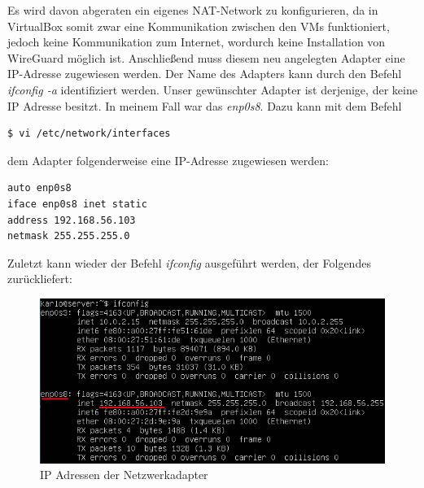 Es wird davon abgeraten ein eigenes NAT-Network zu konfigurieren, da in VirtualBox somit zwar eine Kommunikation zwischen den VMs funktioniert, jedoch keine Kommunikation zum Internet, wordurch keine Installation von WireGuard möglich ist. \newpage \noindent
Anschließend muss diesem neu angelegten Adapter eine IP-Adresse zugewiesen werden. Der Name des Adapters kann durch den Befehl \textit{ifconfig -a} identifiziert werden. Unser gewünschter Adapter ist derjenige, der keine IP Adresse besitzt. In meinem Fall war das \textit{enp0s8}. Dazu kann mit dem Befehl 
\begin{lstlisting}
$ vi /etc/network/interfaces
\end{lstlisting}
dem Adapter folgenderweise eine IP-Adresse zugewiesen werden:
\begin{lstlisting}
auto enp0s8
iface enp0s8 inet static
address 192.168.56.103
netmask 255.255.255.0
\end{lstlisting}
Zuletzt kann wieder der Befehl \textit{ifconfig} ausgeführt werden, der Folgendes zurückliefert:
\begin{figure}[H]
  \centering
  \includegraphics[scale=0.7]{images/ifconfig.PNG}
  \caption{IP Adressen der Netzwerkadapter}
\end{figure} \noindent
